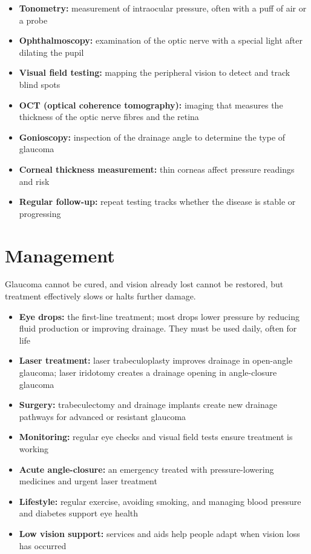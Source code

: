 \begin{itemize}
    \item \textbf{Tonometry:} measurement of intraocular pressure, often with a puff of air or a probe
    \item \textbf{Ophthalmoscopy:} examination of the optic nerve with a special light after dilating the pupil
    \item \textbf{Visual field testing:} mapping the peripheral vision to detect and track blind spots
    \item \textbf{OCT (optical coherence tomography):} imaging that measures the thickness of the optic nerve fibres and the retina
    \item \textbf{Gonioscopy:} inspection of the drainage angle to determine the type of glaucoma
    \item \textbf{Corneal thickness measurement:} thin corneas affect pressure readings and risk
    \item \textbf{Regular follow-up:} repeat testing tracks whether the disease is stable or progressing
\end{itemize}

\section*{Management}
Glaucoma cannot be cured, and vision already lost cannot be restored, but treatment effectively slows or halts further damage.

\begin{itemize}
    \item \textbf{Eye drops:} the first-line treatment; most drops lower pressure by reducing fluid production or improving drainage. They must be used daily, often for life
    \item \textbf{Laser treatment:} laser trabeculoplasty improves drainage in open-angle glaucoma; laser iridotomy creates a drainage opening in angle-closure glaucoma
    \item \textbf{Surgery:} trabeculectomy and drainage implants create new drainage pathways for advanced or resistant glaucoma
    \item \textbf{Monitoring:} regular eye checks and visual field tests ensure treatment is working
    \item \textbf{Acute angle-closure:} an emergency treated with pressure-lowering medicines and urgent laser treatment
    \item \textbf{Lifestyle:} regular exercise, avoiding smoking, and managing blood pressure and diabetes support eye health
    \item \textbf{Low vision support:} services and aids help people adapt when vision loss has occurred
\end{itemize}

